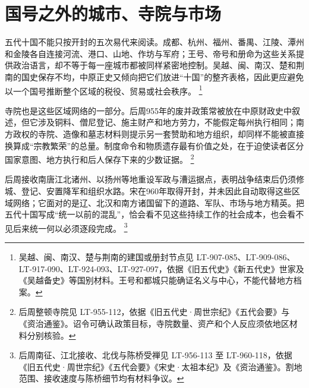 \section{国号之外的城市、寺院与市场}
\label{sec:five-dynasties-regional-society}

五代十国不能只按开封的五次易代来阅读。成都、杭州、福州、番禺、江陵、潭州和金陵各自连接河流、港口、山地、作坊与军府；王号、帝号和册命为这些关系提供政治语言，却不等于每一座城市都被同样紧密地控制。吴越、闽、南汉、楚和荆南的国史保存不均，中原正史又倾向把它们放进“十国”的整齐表格，因此更应避免以一个国号推断整个区域的税役、贸易或社会秩序。%
\footnote{吴越、闽、南汉、楚与荆南的建国或册封节点见 LT-907-085、LT-909-086、LT-917-090、LT-924-093、LT-927-097，依据《旧五代史》《新五代史》世家及《吴越备史》等国别材料。王号和都城只能确证名义与中心，不能代替地方档案。}

寺院也是这些区域网络的一部分。后周955年的废并政策常被放在中原财政史中叙述，但它涉及铜料、僧尼登记、施主财产和地方劳力，不能假定每州执行相同；南方政权的寺院、造像和墓志材料则提示另一套赞助和地方组织，却同样不能被直接换算成“宗教繁荣”的总量。制度命令和物质遗存最有价值之处，在于迫使读者区分国家意图、地方执行和后人保存下来的少数证据。%
\footnote{后周整顿寺院见 LT-955-112，依据《旧五代史·周世宗纪》《五代会要》与《资治通鉴》。诏令可确认政策目标，寺院数量、资产和个人反应须依地区材料分别核验。}

后周接收南唐江北诸州、以扬州等地重设军政与漕运据点，表明战争结束后仍须修城、登记、安置降军和组织水路。宋在960年取得开封，并未因此自动取得这些区域网络；它面对的是辽、北汉和南方诸国留下的道路、军队、市场与地方精英。把五代十国写成“统一以前的混乱”，恰会看不见这些持续工作的社会成本，也会看不见后来统一何以必须逐段完成。%
\footnote{后周南征、江北接收、北伐与陈桥受禅见 LT-956-113 至 LT-960-118，依据《旧五代史·周世宗纪》《五代会要》《宋史·太祖本纪》及《资治通鉴》。割地范围、接收速度与陈桥细节均有材料争议。}
